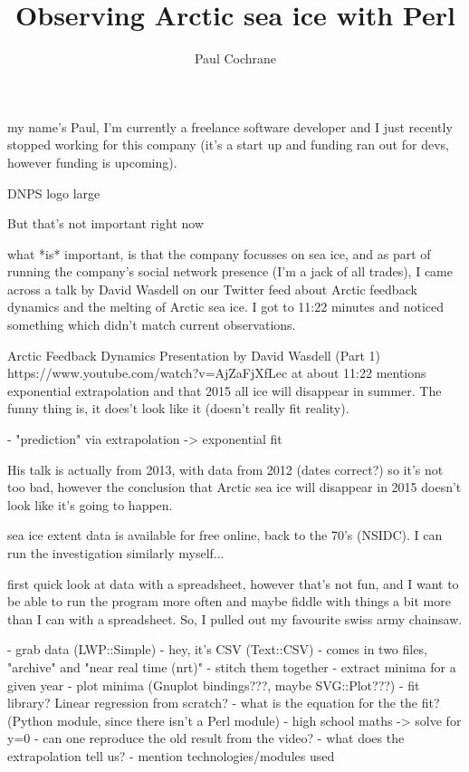 \documentclass{beamer}
\title{Observing Arctic sea ice with Perl}
\author{Paul Cochrane}
\begin{document}
\begin{frame}
    \titlepage
\end{frame}

my name's Paul, I'm currently a freelance software developer and I just
recently stopped working for this company (it's a start up and funding ran
out for devs, however funding is upcoming).

\begin{frame}
    DNPS logo large
\end{frame}

\begin{frame}
    But that's not important right now
\end{frame}

what *is* important, is that the company focusses on sea ice, and as part of
running the company's social network presence (I'm a jack of all trades), I
came across a talk by David Wasdell on our Twitter feed about Arctic
feedback dynamics and the melting of Arctic sea ice.  I got to 11:22 minutes
and noticed something which didn't match current observations.

\begin{frame}
Arctic Feedback Dynamics Presentation by David Wasdell (Part 1)
https://www.youtube.com/watch?v=AjZaFjXfLec
at about 11:22 mentions exponential extrapolation and that 2015 all ice will
disappear in summer.  The funny thing is, it does't look like it (doesn't
really fit reality).

- "prediction" via extrapolation -> exponential fit

His talk is actually from 2013, with data from 2012 (dates correct?) so it's not too bad,
however the conclusion that Arctic sea ice will disappear in 2015 doesn't
look like it's going to happen.

sea ice extent data is available for free online, back to the 70's (NSIDC).  I can
run the investigation similarly myself...
\end{frame}

first quick look at data with a spreadsheet, however that's not fun, and I
want to be able to run the program more often and maybe fiddle with things a
bit more than I can with a spreadsheet.  So, I pulled out my favourite swiss
army chainsaw.

- grab data (LWP::Simple)
- hey, it's CSV (Text::CSV)
- comes in two files, "archive" and "near real time (nrt)"
- stitch them together
- extract minima for a given year
- plot minima (Gnuplot bindings???, maybe SVG::Plot???)
- fit library?  Linear regression from scratch?
- what is the equation for the the fit?  (Python module, since there isn't a
Perl module)
- high school maths -> solve for y=0
- can one reproduce the old result from the video?
- what does the extrapolation tell us?
- mention technologies/modules used
\end{document}
